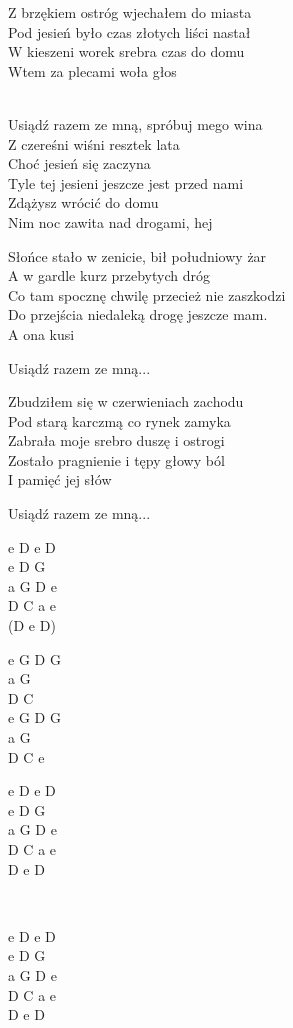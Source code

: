 \begin{text}
    Z brzękiem ostróg wjechałem do miasta\\
    Pod jesień było czas złotych liści nastał\\
    W kieszeni worek srebra czas do domu\\
    Wtem za plecami woła głos\\
    ~

    \vin Usiądź razem ze mną, spróbuj mego wina\\
    \vin Z czereśni wiśni resztek lata\\
    \vin Choć jesień się zaczyna\\
    \vin Tyle tej jesieni jeszcze jest przed nami\\
    \vin Zdążysz wrócić do domu\\
    \vin Nim noc zawita nad drogami, hej

    Słońce stało w zenicie, bił południowy żar\\
    A w gardle kurz przebytych dróg\\
    Co tam spocznę chwilę przecież nie zaszkodzi\\
    Do przejścia niedaleką drogę jeszcze mam.\\
    A ona kusi

    \vin Usiądź razem ze mną...

    Zbudziłem się w czerwieniach zachodu\\
    Pod starą karczmą co rynek zamyka\\
    Zabrała moje srebro duszę i ostrogi\\
    Zostało pragnienie i tępy głowy ból\\
    I pamięć jej słów

    \vin Usiądź razem ze mną...
\end{text}
\begin{chord}
    e D e D\\
    e D G\\
    a G D e\\
    D C a e\\
    (D e D)

    e G D G\\
    a G\\
    D C\\
    e G D G\\
    a G\\
    D C e

    e D e D\\
    e D G\\
    a G D e\\
    D C a e\\
    D e D

    ~

    e D e D\\
    e D G\\
    a G D e\\
    D C a e\\
    D e D
\end{chord}